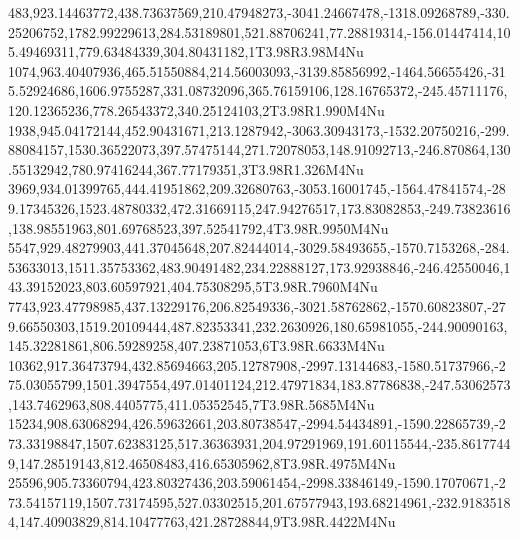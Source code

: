 483,923.14463772,438.73637569,210.47948273,-3041.24667478,-1318.09268789,-330.25206752,1782.99229613,284.53189801,521.88706241,77.28819314,-156.01447414,105.49469311,779.63484339,304.80431182,1T3.98R3.98M4Nu
1074,963.40407936,465.51550884,214.56003093,-3139.85856992,-1464.56655426,-315.52924686,1606.9755287,331.08732096,365.76159106,128.16765372,-245.45711176,120.12365236,778.26543372,340.25124103,2T3.98R1.990M4Nu
1938,945.04172144,452.90431671,213.1287942,-3063.30943173,-1532.20750216,-299.88084157,1530.36522073,397.57475144,271.72078053,148.91092713,-246.870864,130.55132942,780.97416244,367.77179351,3T3.98R1.326M4Nu
3969,934.01399765,444.41951862,209.32680763,-3053.16001745,-1564.47841574,-289.17345326,1523.48780332,472.31669115,247.94276517,173.83082853,-249.73823616,138.98551963,801.69768523,397.52541792,4T3.98R.9950M4Nu
5547,929.48279903,441.37045648,207.82444014,-3029.58493655,-1570.7153268,-284.53633013,1511.35753362,483.90491482,234.22888127,173.92938846,-246.42550046,143.39152023,803.60597921,404.75308295,5T3.98R.7960M4Nu
7743,923.47798985,437.13229176,206.82549336,-3021.58762862,-1570.60823807,-279.66550303,1519.20109444,487.82353341,232.2630926,180.65981055,-244.90090163,145.32281861,806.59289258,407.23871053,6T3.98R.6633M4Nu
10362,917.36473794,432.85694663,205.12787908,-2997.13144683,-1580.51737966,-275.03055799,1501.3947554,497.01401124,212.47971834,183.87786838,-247.53062573,143.7462963,808.4405775,411.05352545,7T3.98R.5685M4Nu
15234,908.63068294,426.59632661,203.80738547,-2994.54434891,-1590.22865739,-273.33198847,1507.62383125,517.36363931,204.97291969,191.60115544,-235.86177449,147.28519143,812.46508483,416.65305962,8T3.98R.4975M4Nu
25596,905.73360794,423.80327436,203.59061454,-2998.33846149,-1590.17070671,-273.54157119,1507.73174595,527.03302515,201.67577943,193.68214961,-232.91835184,147.40903829,814.10477763,421.28728844,9T3.98R.4422M4Nu
